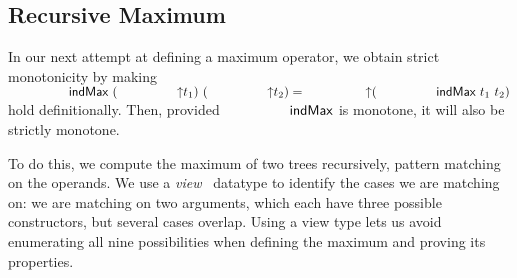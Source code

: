 



\subsection{Recursive Maximum}

In our next attempt at defining a maximum operator, we
obtain strict monotonicity by making $\indMax\ (\up t_1) \ (\up t_2) = \up (\indMax\ t_1\ t_2)$
hold definitionally. Then, provided $\indMax$ is monotone, it will also be
strictly monotone.

To do this, we compute the maximum of two trees recursively,
pattern matching on the operands. We use a \textit{view}~\citep{TODO}
datatype to identify the cases we are matching on: we are matching on two arguments,
which each have three possible constructors, but several cases overlap.
Using a view type lets us avoid enumerating all nine possibilities when defining
the maximum and proving its properties.

\begin{code}[hide]%
%
\>[2]\AgdaSpace{}%
\AgdaSpace{}%
\AgdaSpace{}%
\AgdaSpace{}%
\AgdaSymbol{(}\AgdaSpace{}%
\AgdaSymbol{;}\AgdaSpace{}%
\AgdaOperator{\AgdaFunction{\AgdaUnderscore{}<\AgdaUnderscore{}}}\AgdaSpace{}%
\AgdaSymbol{;}\AgdaSpace{}%
\AgdaOperator{\AgdaPrimitive{\AgdaUnderscore{}+\AgdaUnderscore{}}}\AgdaSymbol{)}\<%
\\
%
\>[2]\AgdaSpace{}%
\AgdaSpace{}%
\<%
\\
%
\>[2]\AgdaSpace{}%
\AgdaSpace{}%
\<%
\\
%
\>[2]\AgdaSpace{}%
\AgdaSpace{}%
\<%
\\
%
\>[2]\AgdaSpace{}%
\AgdaSpace{}%
\<%
\end{code}


